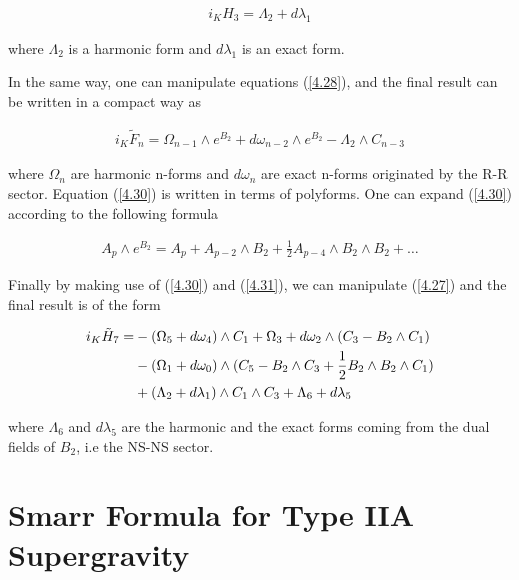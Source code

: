 \documentclass[a4paper,notitlepage]{report}
\begin{document}
\begin{align} \label{4.30}
i_{K} H_{3} = \Lambda_{2} + d\lambda_{1}
\end{align}

\vspace{0.5em}
where $\Lambda_{2}$ is a harmonic form and $d\lambda_{1}$ is an exact form.

\vspace{0.5em}
In the same way, one can manipulate equations (\ref{4.28}), and the final result can be written in a compact way as

\begin{align} \label{4.31}
i_{K} \tilde{F}_{n} = \Omega_{n-1} \wedge e^{B_2} + d\omega_{n-2} \wedge e^{B_2} - \Lambda_{2} \wedge C_{n-3}
\end{align}

\vspace{0.5em}
where $\Omega_{n}$ are harmonic n-forms and $d\omega_{n}$ are exact n-forms originated by the R-R sector. Equation (\ref{4.30}) is written in terms of polyforms. One can expand (\ref{4.30}) according to the following formula

\begin{align} \label{4.32}
A_p \wedge e^{B_2} = A_p + A_{p-2} \wedge B_2 + \frac{1}{2} A_{p-4} \wedge B_2 \wedge B_2 + \ldots 
\end{align}

\vspace{0.5em}
Finally by making use of (\ref{4.30}) and (\ref{4.31}), we can manipulate (\ref{4.27}) and the final result is of the form

\begin{align} \label{4.33}
i_{K} \tilde{H}_{7} = & - (\Omega_{5} + d\omega_{4}) \wedge C_1 + \Omega_{3} + d\omega_{2} \wedge (C_3 - B_2 \wedge C_1) \notag \\
& - (\Omega_{1} + d\omega_{0}) \wedge (C_5 - B_2 \wedge C_3 + \frac{1}{2} B_2 \wedge B_2 \wedge C_1) \notag \\
& + (\Lambda_2 + d\lambda_1) \wedge C_1 \wedge C_3 + \Lambda_6 + d\lambda_5
\end{align}

\vspace{0.5em} 
where $\Lambda_6$ and $d\lambda_5$ are the harmonic and the exact forms coming from the dual fields of $B_2$, i.e the NS-NS sector.

\section{Smarr Formula for Type IIA Supergravity}
\end{document}

